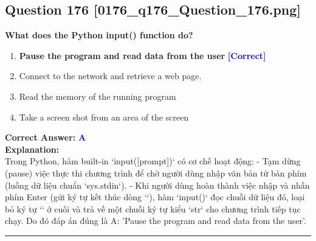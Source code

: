 \documentclass[11pt,a4paper]{article}
\begin{document}
\begin{minipage}{\textwidth}
\subsection*{Question 176 \quad \footnotesize{[0176_q176_Question_176.png]}}
\noindent \textbf{What does the Python input() function do?}

\begin{enumerate}[label=\Alph*.]
    \item \textbf{Pause the program and read data from the user} \hfill \textcolor{blue}{\textbf{[Correct]}}
    \item Connect to the network and retrieve a web page.
    \item Read the memory of the running program
    \item Take a screen shot from an area of the screen
\end{enumerate}

\noindent \textbf{Correct Answer:} \textcolor{blue}{\textbf{A}} \\[4pt]
\noindent \textbf{Explanation:}\\
Trong Python, hàm built-in `input([prompt])` có cơ chế hoạt động:\newline
- Tạm dừng (pause) việc thực thi chương trình để chờ người dùng nhập văn bản từ bàn phím (luồng dữ liệu chuẩn `sys.stdin`).\newline
- Khi người dùng hoàn thành việc nhập và nhấn phím Enter (gửi ký tự kết thúc dòng `\n`), hàm `input()` đọc chuỗi dữ liệu đó, loại bỏ ký tự `\n` ở cuối và trả về một chuỗi ký tự kiểu `str` cho chương trình tiếp tục chạy.\newline
Do đó đáp án đúng là A: 'Pause the program and read data from the user'.
\end{minipage}
\vspace{0.8cm}
\hrule
\vspace{0.5cm}
\end{document}
